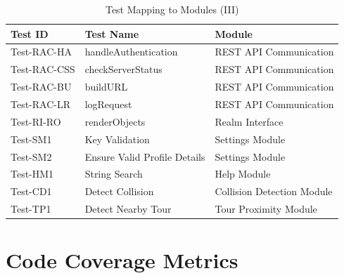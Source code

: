\documentclass[12pt, titlepage]{article}
\begin{document}
\begin{table}[htpb!]
  \centering
  \begin{tabular}{|l|p{6cm}|p{4cm}|}
    \hline
    \textbf{Test ID} & \textbf{Test Name}           & \textbf{Module}            \\
    \hline
    Test-RAC-HA      & handleAuthentication         & REST API Communication     \\
    \hline
    Test-RAC-CSS     & checkServerStatus            & REST API Communication     \\
    \hline
    Test-RAC-BU      & buildURL                     & REST API Communication     \\
    \hline
    Test-RAC-LR      & logRequest                   & REST API Communication     \\
    \hline
    Test-RI-RO       & renderObjects                & Realm Interface            \\
    \hline
    Test-SM1         & Key Validation               & Settings Module            \\
    \hline
    Test-SM2         & Ensure Valid Profile Details & Settings Module            \\
    \hline
    Test-HM1         & String Search                & Help Module                \\
    \hline
    Test-CD1         & Detect Collision             & Collision Detection Module \\
    \hline
    Test-TP1         & Detect Nearby Tour           & Tour Proximity Module      \\
    \hline
  \end{tabular}
  \caption{Test Mapping to Modules (III)}
  \label{tab:test_mapping3}
\end{table}
\pagebreak

\section{Code Coverage Metrics}
\end{document}
